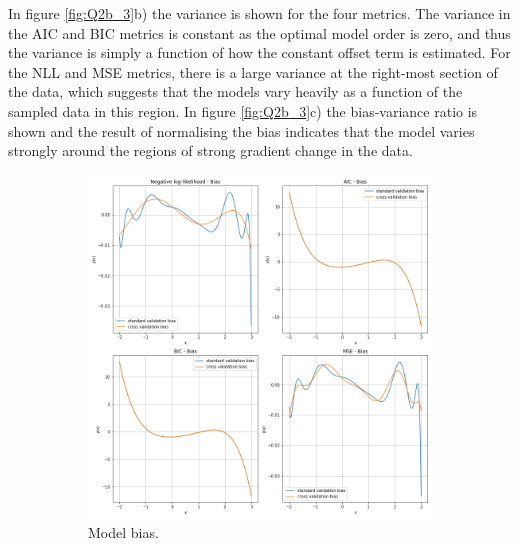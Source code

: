 \documentclass{article}
\begin{document}
In figure \ref{fig:Q2b_3}b) the variance is shown for the four metrics. The variance in the AIC and BIC metrics is constant as the optimal model order is zero, and thus the variance is simply a function of how the constant offset term is estimated. For the NLL and MSE metrics, there is a large variance at the right-most section of the data, which suggests that the models vary heavily as a function of the sampled data in this region. In figure \ref{fig:Q2b_3}c) the bias-variance ratio is shown and the result of normalising the bias indicates that the model varies strongly around the regions of strong gradient change in the data.

\begin{figure}[!htb]
     \centering
     \begin{subfigure}[b]{0.45\textwidth}
         \centering
         \includegraphics[width=\textwidth]{Q2b_fig3.png}
         \caption{Model bias.}
     \end{subfigure}
     \hfill
     \begin{subfigure}[b]{0.45\textwidth}
         \centering

\end{subfigure}
\end{figure}
\end{document}
